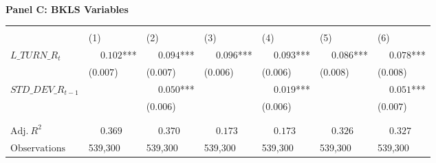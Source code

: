 \begin{table}
\begin{threeparttable}
\phantom{ }\\
\textbf{Panel C: BKLS Variables}
\begin{tabular}[t]{>{\raggedright\arraybackslash}p{3.1cm}>{\raggedright\arraybackslash}p{1.6cm}>{\raggedright\arraybackslash}p{1.6cm}>{\raggedright\arraybackslash}p{1.6cm}>{\raggedright\arraybackslash}p{1.6cm}>{\raggedright\arraybackslash}p{1.6cm}>{\raggedright\arraybackslash}p{1.6cm}}
\toprule
\multicolumn{1}{c}{ } & \multicolumn{2}{c}{$TOTAL\_UNC\_R_t$} & \multicolumn{2}{c}{$COMMON\_UNC\_R_t$} & \multicolumn{2}{c}{$RESIDUAL\_UNC\_R_t$} \\
\cmidrule(l{3pt}r{3pt}){2-3} \cmidrule(l{3pt}r{3pt}){4-5} \cmidrule(l{3pt}r{3pt}){6-7}
 & \phantom{-}(1) & \phantom{-}(2) & \phantom{-}(3) & \phantom{-}(4) & \phantom{-}(5) & \phantom{-}(6)\\
\midrule
$L\_TURN\_R_t$ & $\phantom{-}0.102$*** & $\phantom{-}0.094$*** & $\phantom{-}0.096$*** & $\phantom{-}0.093$*** & $\phantom{-}0.086$*** & $\phantom{-}0.078$***\\
 & (\phantom{-}$0.007$) & (\phantom{-}$0.007$) & (\phantom{-}$0.006$) & (\phantom{-}$0.006$) & (\phantom{-}$0.008$) & (\phantom{-}$0.008$)\\
\addlinespace
$STD\_DEV\_R_{t-1}$ &  & $\phantom{-}0.050$*** &  & $\phantom{-}0.019$*** &  & $\phantom{-}0.051$***\\
 &  & (\phantom{-}$0.006$) &  & (\phantom{-}$0.006$) &  & (\phantom{-}$0.007$)\\
 &  &  &  &  &  \vphantom{1} & \\
\midrule
 &  &  &  &  &  & \\
$\textrm{Adj.} \: R^2$ & {$\phantom{-}0.369$} & {$\phantom{-}0.370$} & {$\phantom{-}0.173$} & {$\phantom{-}0.173$} & {$\phantom{-}0.326$} & {$\phantom{-}0.327$}\\
$\textrm{Observations}$ & {\phantom{-}539,300} & {\phantom{-}539,300} & {\phantom{-}539,300} & {\phantom{-}539,300} & {\phantom{-}539,300} & {\phantom{-}539,300}\\
\bottomrule
\end{tabular}
\begin{tablenotes}

\end{tablenotes}
\end{threeparttable}
\end{table}
